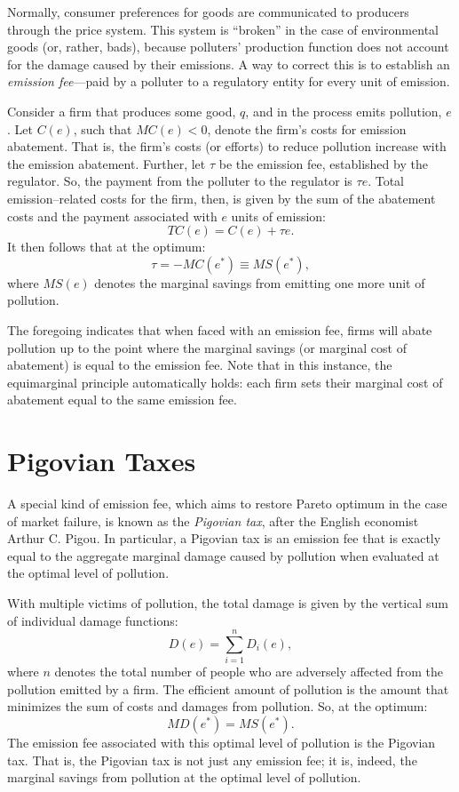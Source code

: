 \documentclass[
]{book}
\begin{document}
Normally, consumer preferences for goods are communicated to producers through the price system. This system is ``broken'' in the case of environmental goods (or, rather, bads), because polluters' production function does not account for the damage caused by their emissions. A way to correct this is to establish an \emph{emission fee}---paid by a polluter to a regulatory entity for every unit of emission.

Consider a firm that produces some good, \(q\), and in the process emits pollution, \(e\). Let \(C(e)\), such that \(MC(e)<0\), denote the firm's costs for emission abatement. That is, the firm's costs (or efforts) to reduce pollution increase with the emission abatement. Further, let \(\tau\) be the emission fee, established by the regulator. So, the payment from the polluter to the regulator is \(\tau e\). Total emission--related costs for the firm, then, is given by the sum of the abatement costs and the payment associated with \(e\) units of emission: \[TC(e) = C(e)+\tau e.\] It then follows that at the optimum: \[\tau=-MC(e^*) \equiv MS(e^*),\] where \(MS(e)\) denotes the marginal savings from emitting one more unit of pollution.

The foregoing indicates that when faced with an emission fee, firms will abate pollution up to the point where the marginal savings (or marginal cost of abatement) is equal to the emission fee. Note that in this instance, the equimarginal principle automatically holds: each firm sets their marginal cost of abatement equal to the same emission fee.

\hypertarget{pigovian-taxes}{%
\section{Pigovian Taxes}\label{pigovian-taxes}}

A special kind of emission fee, which aims to restore Pareto optimum in the case of market failure, is known as the \emph{Pigovian tax}, after the English economist Arthur C. Pigou. In particular, a Pigovian tax is an emission fee that is exactly equal to the aggregate marginal damage caused by pollution when evaluated at the optimal level of pollution.

With multiple victims of pollution, the total damage is given by the vertical sum of individual damage functions: \[D(e) = \sum_{i=1}^{n}D_i(e),\] where \(n\) denotes the total number of people who are adversely affected from the pollution emitted by a firm. The efficient amount of pollution is the amount that minimizes the sum of costs and damages from pollution. So, at the optimum: \[MD(e^*) = MS(e^*).\] The emission fee associated with this optimal level of pollution is the Pigovian tax. That is, the Pigovian tax is not just any emission fee; it is, indeed, the marginal savings from pollution at the optimal level of pollution.
\end{document}
